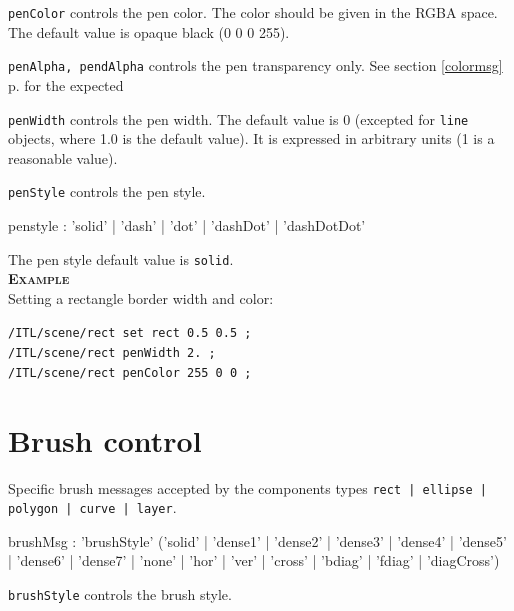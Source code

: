 \documentclass[a4paper,twoside]{report}
\newcommand{\sublevel}[1]	{\section{#1}}
\newcommand{\fullref}[1]	{\ref{#1} p.\pageref{#1}}
\newcommand{\OSC}[1]		{\texttt{#1}}
\newcommand{\example}		{\textbf{\hspace{-1.5cm}\textbf{\textsc{Example }}}}
\let\olditemize\itemize
\let\oldenditemize\enditemize
\renewenvironment{itemize} 	{\olditemize \setlength{\itemsep}{1mm}}{\oldenditemize}
\newcommand{\sample}	[1]			{\vspace{-2mm}\begin{center}\colorbox{mygrey}{
								\begin{minipage}[t]{0.9\columnwidth} 
								{\small \texttt{#1}}
								\end{minipage}}\end{center}}
\begin{document}
\begin{itemize}
\item \OSC{penColor} controls the pen color. The color should be given in the RGBA space. The default value is opaque black (0 0 0 255).
\item \OSC{penAlpha, pendAlpha} controls the pen transparency only. See section \fullref{colormsg} for the expected \item \OSC{penWidth} controls the pen width. The default value is 0 (excepted for \OSC{line} objects, where 1.0 is the default value). It is expressed in arbitrary units (1 is a reasonable value).
\item \OSC{penStyle} controls the pen style.
 \end{itemize}


\begin{rail}
penstyle : 'solid' | 'dash' | 'dot' | 'dashDot' | 'dashDotDot'
\end{rail}

The pen style default value is \OSC{solid}.\\

\example \\
Setting a rectangle border width and color:
\sample{/ITL/scene/rect set rect 0.5 0.5 ;\\
/ITL/scene/rect penWidth 2. ;\\
/ITL/scene/rect penColor 255 0 0 ;  
}


\sublevel{Brush control}
\label{brush}
Specific brush messages accepted by the components types \OSC{rect | ellipse | polygon | curve |  layer}.
\begin{rail}
brushMsg : 	  'brushStyle' ('solid' | 'dense1' | 'dense2' | 'dense3' | 'dense4' | 'dense5' | 'dense6' | 'dense7' | 'none' | 'hor' | 'ver' | 'cross' | 'bdiag' | 'fdiag' | 'diagCross')
\end{rail}

\begin{itemize}
\item \OSC{brushStyle} controls the brush style.
\end{itemize}

\end{document}
